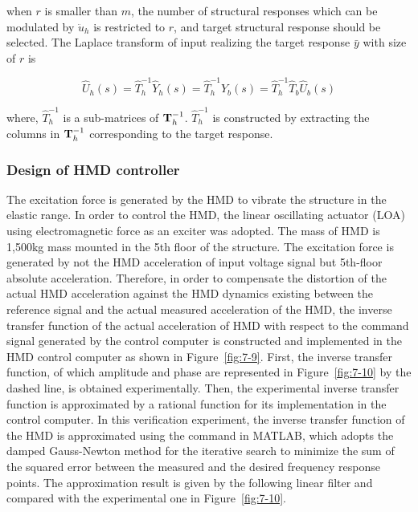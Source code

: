 when $r$ is smaller than $m$, the number of structural responses which can be modulated by $\ddot{u}_{h}$ is restricted to $r$, and target structural response should be selected. The Laplace transform of input realizing the target response $\bar{y}$ with size of $r$ is

\begin{equation}\label{eq:7-14}
\hat{U}_{h}(s) = \hat{T}_{h}^{-1}\hat{Y}_{h}(s) = \hat{T}_{h}^{-1}\hat{Y}_{b}(s) = \hat{T}_{h}^{-1}\hat{T}_{b}\hat{U}_{b}(s)
\end{equation}

where, $\hat{T}_{h}^{-1}$ is a sub-matrices of $\mathbf{T}_{h}^{-1}$. $\hat{T}_{h}^{-1}$ is constructed by extracting the columns in $\mathbf{T}_{h}^{-1}$ corresponding to the target response.

\subsubsection{Design of HMD controller}\label{sec:7-5-2}
The excitation force is generated by the HMD to vibrate the structure in the elastic range. In order to control the HMD, the linear oscillating actuator (LOA) using electromagnetic force as an exciter was adopted. The mass of HMD is 1,500kg mass mounted in the 5th floor of the structure. The excitation force is generated by not the HMD acceleration of input voltage signal but 5th-floor absolute acceleration. Therefore, in order to compensate the distortion of the actual HMD acceleration against the HMD dynamics existing between the reference signal and the actual measured acceleration of the HMD, the inverse transfer function of the actual acceleration of HMD with respect to the command signal generated by the control computer is constructed and implemented in the HMD control computer as shown in Figure~\ref{fig:7-9}. First, the inverse transfer function, of which amplitude and phase are represented in Figure~\ref{fig:7-10} by the dashed line, is obtained experimentally. Then, the experimental inverse transfer function is approximated by a rational function for its implementation in the control computer. In this verification experiment, the inverse transfer function of the HMD is approximated using the command  in MATLAB\citep{coleman1999optimization}, which adopts the damped Gauss-Newton method for the iterative search to minimize the sum of the squared error between the measured and the desired frequency response points\citep{dennis1983numerical}. The approximation result is given by the following linear filter and compared with the experimental one in Figure~\ref{fig:7-10}.

